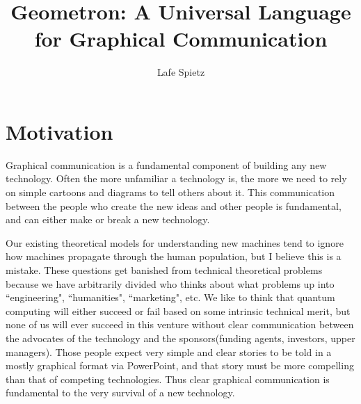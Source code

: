 \documentclass[11pt]{article}
\begin{document}
\title{Geometron: A Universal Language for Graphical Communication}
\author{Lafe Spietz}


\section{Motivation}

    Graphical communication is a fundamental component of building any new technology.  Often the more unfamiliar a technology is, the more we need to rely on simple cartoons and diagrams to tell others about it.  This communication between the people who create the new ideas and other people is fundamental, and can either make or break a new technology.   

    Our existing theoretical models for understanding new machines tend to ignore how machines propagate through the human population, but I believe this is a mistake.  These questions get banished from technical theoretical problems because we have arbitrarily divided who thinks about what problems up into ``engineering", ``humanities", ``marketing", etc.  We like to think that quantum computing will either succeed or fail based on some intrinsic technical merit, but none of us will ever succeed in this venture without clear communication between the advocates of the technology and the sponsors(funding agents, investors, upper managers).  Those people expect very simple and clear stories to be told in a mostly graphical format via PowerPoint, and that story must be more compelling than that of competing technologies.  Thus clear graphical communication is fundamental to the very survival of a new technology.  
\end{document}
